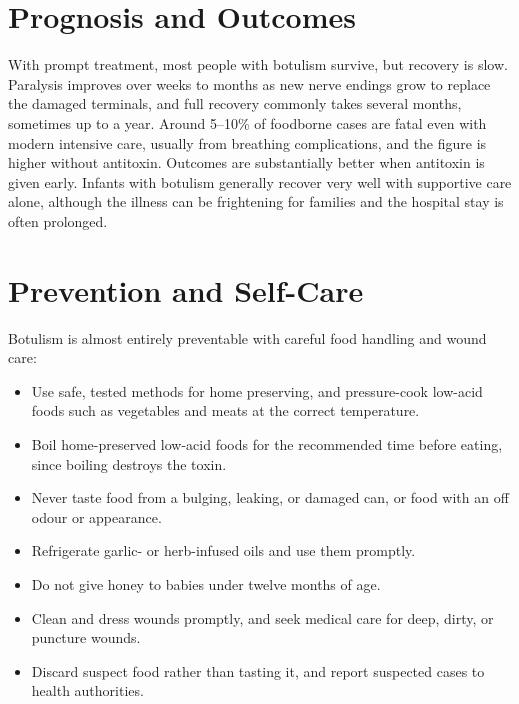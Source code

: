 \section*{Prognosis and Outcomes}
With prompt treatment, most people with botulism survive, but recovery is slow. Paralysis improves over weeks to months as new nerve endings grow to replace the damaged terminals, and full recovery commonly takes several months, sometimes up to a year. Around 5--10\% of foodborne cases are fatal even with modern intensive care, usually from breathing complications, and the figure is higher without antitoxin. Outcomes are substantially better when antitoxin is given early. Infants with botulism generally recover very well with supportive care alone, although the illness can be frightening for families and the hospital stay is often prolonged.

\section*{Prevention and Self-Care}
Botulism is almost entirely preventable with careful food handling and wound care:
\begin{itemize}
    \item Use safe, tested methods for home preserving, and pressure-cook low-acid foods such as vegetables and meats at the correct temperature.
    \item Boil home-preserved low-acid foods for the recommended time before eating, since boiling destroys the toxin.
    \item Never taste food from a bulging, leaking, or damaged can, or food with an off odour or appearance.
    \item Refrigerate garlic- or herb-infused oils and use them promptly.
    \item Do not give honey to babies under twelve months of age.
    \item Clean and dress wounds promptly, and seek medical care for deep, dirty, or puncture wounds.
    \item Discard suspect food rather than tasting it, and report suspected cases to health authorities.
\end{itemize}

